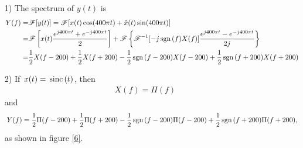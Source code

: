 \documentclass{assignment}
\begin{document}
\begin{sol}
    \begin{itemize}
        \item[1)] The spectrum of $y(t)$ is
        \begin{align}
            \notag Y(f)=&\mathscr{F}[y(t)]=\mathscr{F}[x(t)\cos(400\pi t)+\hat{x}(t)\sin(400\pi t)]\\
            \notag=&\mathscr{F}\left[x(t)\frac{e^{j400\pi t}+e^{-j400\pi t}}{2}\right]+\mathscr{F}\left\{\mathscr{F}^{-1}[-j\,\text{sgn}\,(f)X(f)]\frac{e^{j400\pi t}-e^{-j400\pi t}}{2j}\right\}\\
            =&\frac{1}{2}X(f-200)+\frac{1}{2}X(f+200)-\frac{1}{2}\,\text{sgn}\,(f-200)X(f-200)+\frac{1}{2}\,\text{sgn}\,(f+200)X(f+200)
        \end{align}
        \item[2)] If $x(t)=\,\text{sinc}\,(t)$, then
        \begin{align}
            X(f)=\Pi(f)
        \end{align}
        and
        \begin{align}
            Y(f)=\frac{1}{2}\Pi(f-200)+\frac{1}{2}\Pi(f+200)-\frac{1}{2}\,\text{sgn}\,(f-200)\Pi(f-200)+\frac{1}{2}\,\text{sgn}\,(f+200)\Pi(f+200),
        \end{align}
        as shown in figure \ref{6}.
        \begin{figure}[h]
            \centering

\end{figure}
\end{itemize}
\end{sol}
\end{document}
